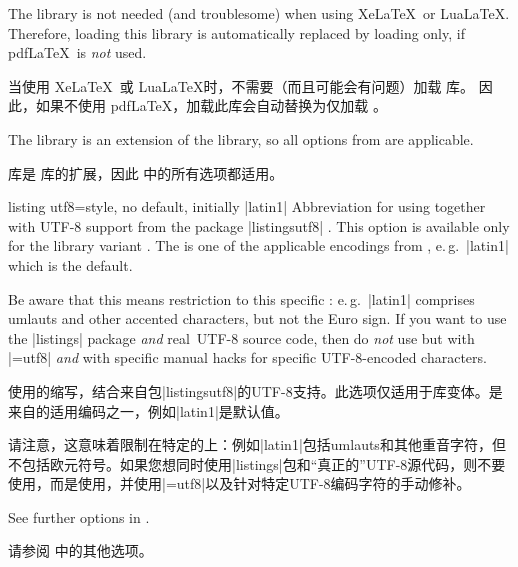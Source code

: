 \begin{marker}
The  library is not needed (and troublesome) when using Xe\LaTeX\ or Lua\LaTeX.
Therefore, loading this library is automatically replaced by loading
 only, if pdf\LaTeX\ is \emph{not} used.

当使用 Xe\LaTeX\ 或 Lua\LaTeX 时，不需要（而且可能会有问题）加载  库。 因此，如果不使用 pdf\LaTeX，加载此库会自动替换为仅加载 。
\end{marker}

The  library is an extension of the
 library, so
all options from  are applicable.

 库是  库的扩展，因此  中的所有选项都适用。
\begin{docTcbKey}{listing utf8}{=}{style, no default, initially |latin1|}
  Abbreviation for using 
  together with UTF-8 support from the package |listingsutf8| \cite{oberdiek:listingsutf8}.
  This option is available only for the library variant .
  The  is one of
  the applicable encodings from \cite{oberdiek:listingsutf8}, e.\,g.\ |latin1|
  which is the default.\par
  Be aware that this means restriction to this specific :
  e.\,g.\ |latin1| comprises umlauts and other accented characters, but not
  the Euro sign. If you want to use the |listings| package \emph{and} \flqq real\frqq\
  UTF-8 source code, then do \emph{not} use  but 
  with
  |=utf8|
  \emph{and} with specific manual hacks for specific UTF-8-encoded characters.

使用的缩写，结合来自包|listingsutf8|\cite{oberdiek:listingsutf8}的UTF-8支持。此选项仅适用于库变体。是来自\cite{oberdiek:listingsutf8}的适用编码之一，例如|latin1|是默认值。\par 请注意，这意味着限制在特定的上：例如|latin1|包括umlauts和其他重音字符，但不包括欧元符号。如果您想同时使用|listings|包和“真正的”UTF-8源代码，则不要使用，而是使用，并使用|=utf8|以及针对特定UTF-8编码字符的手动修补。
\end{docTcbKey}

See further options in .

请参阅  中的其他选项。